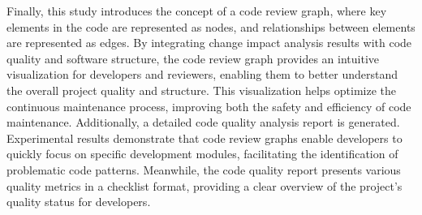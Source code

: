 \begin{eabstract}
Finally, this study introduces the concept of a code review graph, where key elements in the code are represented as nodes, and relationships between elements are represented as edges. By integrating change impact analysis results with code quality and software structure, the code review graph provides an intuitive visualization for developers and reviewers, enabling them to better understand the overall project quality and structure. This visualization helps optimize the continuous maintenance process, improving both the safety and efficiency of code maintenance. Additionally, a detailed code quality analysis report is generated. Experimental results demonstrate that code review graphs enable developers to quickly focus on specific development modules, facilitating the identification of problematic code patterns. Meanwhile, the code quality report presents various quality metrics in a checklist format, providing a clear overview of the project's quality status for developers.
\end{eabstract}
